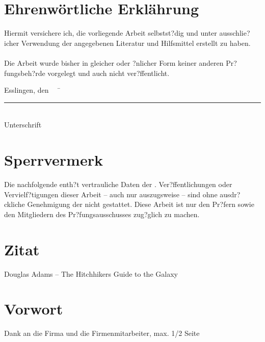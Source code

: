 \chapter*{Ehrenwörtliche Erklährung}

Hiermit versichere ich, die vorliegende Arbeit selbstst?dig und unter ausschlie?icher Verwendung der angegebenen Literatur und Hilfsmittel erstellt zu haben.\\\\
Die Arbeit wurde bisher in gleicher oder ?nlicher Form keiner anderen Pr?fungsbeh?rde vorgelegt und auch nicht ver?ffentlicht.\\
\begin{tabbing}
Esslingen, den \workDatum ~~	\= \rule{5cm}{0.3mm}\\
    Unterschrift
\end{tabbing}
%
\newpage
%
\chapter*{Sperrvermerk} %

Die nachfolgende \workTyp enth?t vertrauliche Daten der \workFirma.
Ver?ffentlichungen oder Vervielf?tigungen dieser Arbeit -- auch nur auszugsweise -- sind ohne ausdr?ckliche Genehmigung der \workFirma nicht gestattet.
Diese Arbeit ist nur den Pr?fern sowie den Mitgliedern des Pr?fungsausschusses zug?glich zu machen.
\newpage
%
\chapter*{Zitat} %
\begin{center}
\begin{minipage}{12cm}
\hfill \textsf Douglas Adams -- The Hitchhikers Guide to the Galaxy
\end{minipage}
\end{center}
\newpage{}
\chapter*{Vorwort} %

Dank an die Firma und die Firmenmitarbeiter, max. 1/2 Seite

\newpage
